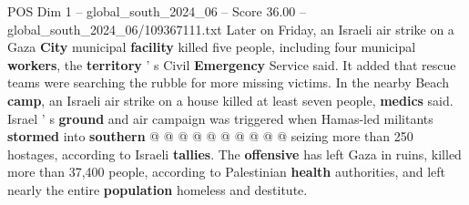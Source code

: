 \begin{textsample}{POS Dim 1 – global\_south\_2024\_06 – Score 36.00 – global\_south\_2024\_06/109367111.txt}
Later on Friday, an Israeli air strike on a Gaza \textbf{City} municipal \textbf{facility} killed five people, including four municipal \textbf{workers}, the \textbf{territory} ' s Civil \textbf{Emergency} Service said.
It added that rescue teams were searching the rubble for more missing victims.
In the nearby Beach \textbf{camp}, an Israeli air strike on a house killed at least seven people, \textbf{medics} said.
Israel ' s \textbf{ground} and air campaign was triggered when Hamas-led militants \textbf{stormed} into \textbf{southern} @ @ @ @ @ @ @ @ @ @ seizing more than 250 hostages, according to Israeli \textbf{tallies}.
The \textbf{offensive} has left Gaza in ruins, killed more than 37,400 people, according to Palestinian \textbf{health} authorities, and left nearly the entire \textbf{population} homeless and destitute.

\end{textsample}
